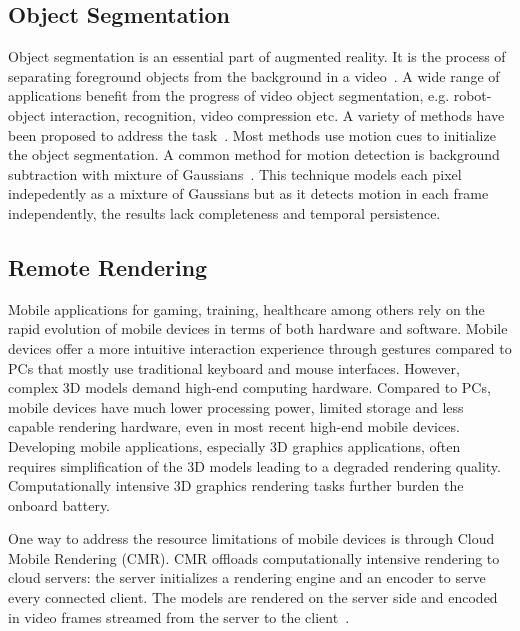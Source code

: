 \subsection{Object Segmentation}

Object segmentation is an essential part of augmented reality.
It is the process of separating foreground objects from the background in a video~\cite{papazoglou2013}. A wide range of applications benefit from the progress of video object segmentation, e.g. robot-object interaction, recognition, video compression etc.
%
A variety of methods have been proposed to address the task~\cite{papazoglou2013,ma2012,wang2015,brox2010,taylor2015}. Most methods use motion cues to initialize the object segmentation.
A common method for motion detection is  background subtraction with mixture of Gaussians~\cite{kaewtrakulpong2002,zivkovic2004}. This technique models each pixel indepedently as a mixture of Gaussians 
but as it detects motion in each frame independently, the results lack completeness and temporal persistence.

\subsection{Remote Rendering}

Mobile applications for gaming, training, healthcare among others rely on the rapid evolution of mobile devices in terms of both hardware and software.
Mobile devices offer a more intuitive interaction experience through gestures 
compared to PCs that mostly use traditional keyboard and mouse interfaces.
However, complex 3D models demand high-end computing hardware. Compared to PCs, mobile devices have much lower processing power, limited storage and less capable rendering hardware, even in most recent high-end mobile devices.
Developing mobile applications, especially 3D graphics applications, often requires simplification of the 3D models leading to a degraded rendering quality.
Computationally intensive 3D graphics rendering tasks further burden the onboard battery.

One way to address the resource limitations of mobile devices is through Cloud Mobile Rendering (CMR).
CMR offloads computationally intensive rendering to cloud servers:
the server initializes a rendering engine and an encoder to serve every connected client. The models are rendered on the server side and encoded in video frames streamed from the server to the client~\cite{lamberti2007,lu2011,ma2017,chang2004,simoens2012}.

